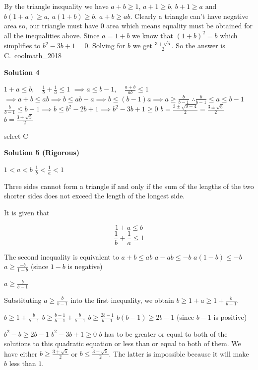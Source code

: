 \begin{enumerate}
By the triangle inequality we have $a+b \ge 1$, $a + 1 \ge b$, $b+1 \ge a$ and $b(1+a) \ge a$, $a(1+b) \ge b$, $a+b \ge ab$. Clearly a triangle can't have negative area so, our triangle must have $0$ area which means equality must be obtained for all the inequalities above. Since $a = 1+b$ we know that $(1+b)^2 = b$ which simplifies to $b^2 - 3b + 1 = 0$. Solving for $b$ we get $\frac{3 + \sqrt{5}}{2}$. So the answer is C.~coolmath\_2018

 



\textbf{Solution 4}

$1+a \leq b, \quad \frac{1}{b} + \frac{1}{a} \leq 1$
$\implies a \leq b-1, \quad \frac{a+b}{ab} \leq 1$
$\implies a+b \leq ab \implies b \leq ab-a \implies b \leq(b-1)a \implies a \geq \frac{b}{b-1}$
$\therefore \frac{b}{b-1} \leq a \leq b-1$
$\frac{b}{b-1} \leq b-1 \implies b \leq b^2-2b+1 \implies b^2-3b+1 \geq 0$
$b= \frac{3 \pm \sqrt{9-4}}{2}= \frac{3 \pm \sqrt{5}}{2}$
$b=\frac{3 + \sqrt{5}}{2}$

 select C

 


 



\textbf{Solution 5 (Rigorous)}

$1<a<b$
$\frac{1}{b}<\frac{1}{a}<1$

 
Three sides cannot form a triangle if and only if the sum of the lengths of the two shorter sides does not exceed the length of the longest side.

 It is given that

 
 \[1+a\leq{b}\]
 \[\frac{1}{b}+\frac{1}{a}\leq{1}\]

 The second inequality is equivalent to $a+b\leq{ab}$
$a-ab\leq{-b}$
$a(1-b)\leq{-b}$
$a\geq\frac{-b}{1-b}$ (since $1-b$ is negative)

 $a\geq\frac{b}{b-1}$

 
Substituting $a\geq\frac{b}{b-1}$ into the first inequality, we obtain $b\geq{1+a}\geq{1+\frac{b}{b-1}}$.

 
$b\geq{1+\frac{b}{b-1}}$
$b\geq{\frac{b-1}{b-1}+\frac{b}{b-1}}$
$b\geq{\frac{2b-1}{b-1}}$
$b(b-1)\geq{2b-1}$ (since $b-1$ is positive)

 $b^2-b\geq{2b-1}$
$b^2-3b+1\geq{0}$
$b$ has to be greater or equal to both of the solutions to this quadratic equation or less than or equal to both of them. We have either $b\geq{\frac{3+{\sqrt{5}}}{2}}$ or $b\leq{\frac{3-{\sqrt{5}}}{2}}$. The latter is impossible because it will make $b$ less than $1$.


\end{enumerate}
